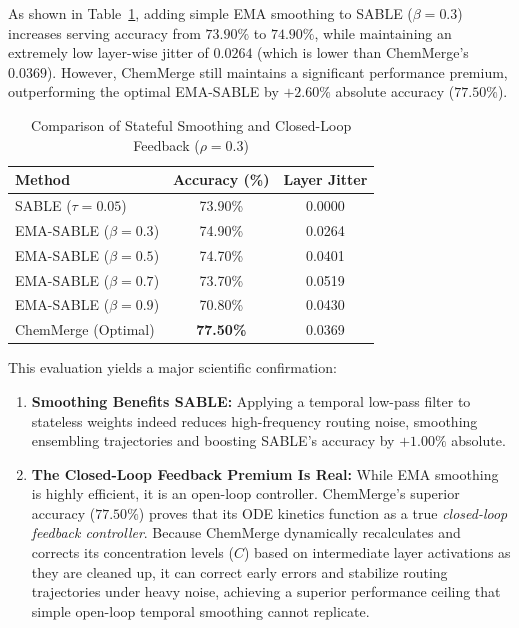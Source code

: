 As shown in Table~\ref{tab:ema_sable}, adding simple EMA smoothing to SABLE ($\beta = 0.3$) increases serving accuracy from $73.90\%$ to $74.90\%$, while maintaining an extremely low layer-wise jitter of $0.0264$ (which is lower than ChemMerge's $0.0369$). However, ChemMerge still maintains a significant performance premium, outperforming the optimal EMA-SABLE by $+2.60\%$ absolute accuracy ($77.50\%$).

\begin{table}[ht]
\caption{Comparison of Stateful Smoothing and Closed-Loop Feedback ($\rho=0.3$)}
\label{tab:ema_sable}
\centering
\begin{footnotesize}
\setlength{\tabcolsep}{3.0pt}
\begin{tabular}{lcc}
\toprule
\textbf{Method} & \textbf{Accuracy (\%)} & \textbf{Layer Jitter} \\
\midrule
SABLE ($\tau=0.05$) & 73.90\% & 0.0000 \\
EMA-SABLE ($\beta=0.3$) & 74.90\% & 0.0264 \\
EMA-SABLE ($\beta=0.5$) & 74.70\% & 0.0401 \\
EMA-SABLE ($\beta=0.7$) & 73.70\% & 0.0519 \\
EMA-SABLE ($\beta=0.9$) & 70.80\% & 0.0430 \\
\midrule
ChemMerge (Optimal) & \textbf{77.50\%} & 0.0369 \\
\bottomrule
\end{tabular}
\end{footnotesize}
\end{table}

This evaluation yields a major scientific confirmation:
\begin{enumerate}
    \item \textbf{Smoothing Benefits SABLE:} Applying a temporal low-pass filter to stateless weights indeed reduces high-frequency routing noise, smoothing ensembling trajectories and boosting SABLE's accuracy by $+1.00\%$ absolute.
    \item \textbf{The Closed-Loop Feedback Premium Is Real:} While EMA smoothing is highly efficient, it is an open-loop controller. ChemMerge's superior accuracy ($77.50\%$) proves that its ODE kinetics function as a true \emph{closed-loop feedback controller}. Because ChemMerge dynamically recalculates and corrects its concentration levels ($C$) based on intermediate layer activations as they are cleaned up, it can correct early errors and stabilize routing trajectories under heavy noise, achieving a superior performance ceiling that simple open-loop temporal smoothing cannot replicate.
\end{enumerate}

